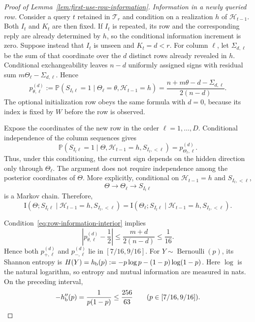 \documentclass{article}
\theoremstyle{definition}
\newcommand{\Prob}{\mathbb{P}}
\begin{document}
\begin{proof}[Proof of Lemma~\ref{lem:first-use-row-information}]
\emph{Information in a newly queried row.}
Consider a query $t$ retained in $\mathcal T_r$ and condition on a realization
$h$ of $\mathcal H_{t-1}$.  Both $I_t$ and $K_t$ are then fixed.  If $I_t$ is
repeated, its row and the corresponding reply are already determined by $h$,
so the conditional information increment is zero.  Suppose instead that
$I_t$ is unseen and $K_t=d<r$.  For column $\ell$, let $\Sigma_{d,\ell}$ be the
sum of that coordinate over the $d$ distinct rows already revealed in $h$.
Conditional exchangeability leaves $n-d$ uniformly assigned signs with
residual sum $m\Theta_\ell-\Sigma_{d,\ell}$.  Hence
\begin{equation}
 p_{\theta,\ell}^{(d)}
 :=
 \Prob(S_{I_t\ell}=1
 \mid \Theta_\ell=\theta,\mathcal H_{t-1}=h)
 =
 \frac{n+m\theta-d-\Sigma_{d,\ell}}{2(n-d)}.
 \label{eq:conditional-unseen-sign}
\end{equation}
The optional initialization row obeys the same formula with $d=0$, because its
index is fixed by $W$ before the row is observed.

Expose the coordinates of the new row in the order $\ell=1,\ldots,D$.
Conditional independence of the column sequences gives
\[
 \Prob(S_{I_t\ell}=1
 \mid\Theta,\mathcal H_{t-1}=h,S_{I_t,<\ell})
 =p_{\Theta_\ell,\ell}^{(d)}.
\]
Thus, under this conditioning, the current sign depends on the hidden
direction only through $\Theta_\ell$.  The argument does not require
independence among the posterior coordinates of $\Theta$.
More explicitly, conditional on $\mathcal H_{t-1}=h$ and
$S_{I_t,<\ell}$,
\[
 \Theta\longrightarrow\Theta_\ell\longrightarrow S_{I_t\ell}
\]
is a Markov chain.  Therefore,
\[
 \mathrm I(\Theta;S_{I_t\ell}
 \mid\mathcal H_{t-1}=h,S_{I_t,<\ell})
 =
 \mathrm I(\Theta_\ell;S_{I_t\ell}
 \mid\mathcal H_{t-1}=h,S_{I_t,<\ell}).
\]

Condition~\eqref{eq:row-information-interior} implies
\[
 \left|p_{\theta,\ell}^{(d)}-\frac12\right|
 \le
 \frac{m+d}{2(n-d)}
 \le\frac1{16}.
\]
Hence both $p_{+,\ell}^{(d)}$ and $p_{-,\ell}^{(d)}$ lie in
$[7/16,9/16]$.  For $Y\sim\operatorname{Bernoulli}(p)$, its Shannon entropy is
$H(Y)=h_{\rm b}(p):=-p\log p-(1-p)\log(1-p)$.  Here $\log$ is the natural
logarithm, so entropy and mutual information are measured in nats.  On the
preceding interval,
\[
 -h_{\rm b}''(p)=\frac1{p(1-p)}
 \le\frac{256}{63}
 \qquad (p\in[7/16,9/16]).
\]


\end{proof}
\end{document}
